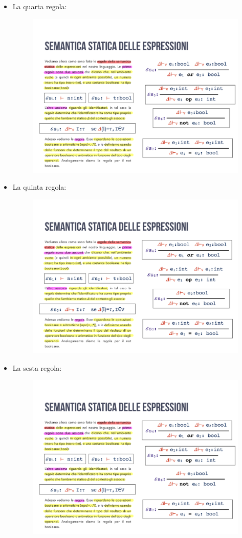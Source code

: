 \documentclass[a4paper]{article}
\begin{document}
\begin{itemize}
		\item La quarta regola:
		\begin{figure}[!htp]
			\centering
			\includegraphics[width=.6\textwidth]{img/regola_semantica-4.pdf}
		\end{figure}
	
		\item La quinta regola:
		\begin{figure}[!htp]
			\centering
			\includegraphics[width=.6\textwidth]{img/regola_semantica-5.pdf}
		\end{figure}
	
		\item La sesta regola:
		\begin{figure}[!htp]
			\centering
			\includegraphics[width=.5\textwidth]{img/regola_semantica-6.pdf}
		\end{figure}\newpage
	

\end{itemize}
\end{document}
